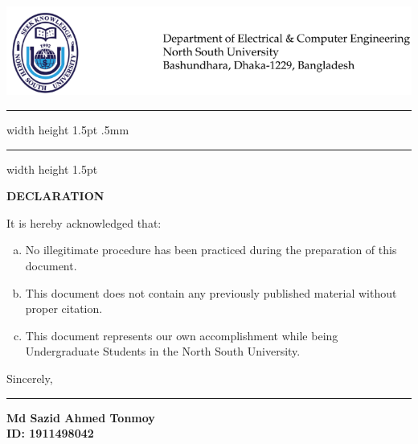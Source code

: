 
\chapter*{}
\vspace*{-5cm}

{\centering \includegraphics[width=\linewidth, scale=1]{01_Declaration/letterhead.png}}
{\hrule width \hsize height 1.5pt \kern .5mm \hrule width \hsize height 1.5pt}
\vspace*{2ex}
\begin{center}
\textbf{\Large DECLARATION}
\end{center}
\vspace{2ex}
It is hereby acknowledged that: 
\begin{enumerate}[a.]
	\item No illegitimate procedure has been practiced during the preparation of this document.
	\item This document does not contain any previously published material without proper citation.
	\item This document represents our own accomplishment while being Undergraduate Students in the North South University.
\end{enumerate}
Sincerely,\\
\vspace{10em}
\begin{minipage}[t]{0.35\textwidth}
\end{minipage}%
\hfill
\begin{minipage}[t]{0.55\textwidth}
    \raggedleft
    \hrule\vspace{2ex}
     \textbf{Md Sazid Ahmed Tonmoy} \\
     \textbf{ID: 1911498042}
\end{minipage}
\let\cleardoublepage\clearpage

